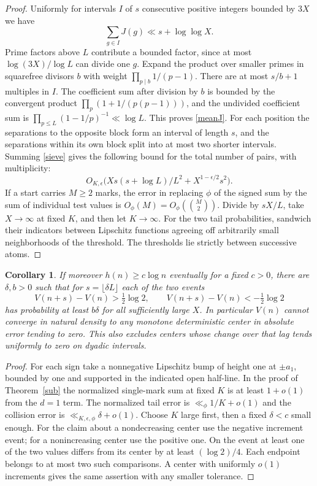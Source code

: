 \documentclass[10pt]{article}
\newtheorem{corollary}[theorem]{Corollary}
\begin{document}
\begin{proof}
Uniformly for intervals $I$ of $s$ consecutive positive integers bounded by $3X$ we have
\begin{equation}\label{meanJ}
 \sum_{g\in I}J(g)\ll s+\log\log X .
\end{equation}
Prime factors above $L$ contribute a bounded factor, since at most $\log(3X)/\log L$ can divide one $g$. Expand the product over smaller primes in squarefree divisors $b$ with weight $\prod_{p\mid b}1/(p-1)$. There are at most $s/b+1$ multiples in $I$. The coefficient sum after division by $b$ is bounded by the convergent product $\prod_p(1+1/(p(p-1)))$, and the undivided coefficient sum is $\prod_{p\le L}(1-1/p)^{-1}\ll\log L$. This proves \eqref{meanJ}. For each position the separations to the opposite block form an interval of length $s$, and the separations within its own block split into at most two shorter intervals. Summing \eqref{sieve} gives the following bound for the total number of pairs, with multiplicity:
\[
 O_{K,\epsilon}\big(Xs(s+\log L)/L^2+X^{1-\epsilon/2}s^2\big).
\]
If a start carries $M\ge2$ marks, the error in replacing $\phi$ of the signed sum by the sum of individual test values is $O_\phi(M)=O_\phi(\binom M2)$. Divide by $sX/L$, take $X\to\infty$ at fixed $K$, and then let $K\to\infty$. For the two tail probabilities, sandwich their indicators between Lipschitz functions agreeing off arbitrarily small neighborhoods of the threshold. The thresholds lie strictly between successive atoms.
\end{proof}

\begin{corollary}\label{anti}
If moreover $h(n)\ge c\log n$ eventually for a fixed $c>0$, there are $\delta,b>0$ such that for $s=\lfloor\delta L\rfloor$ each of the two events
\[
 V(n+s)-V(n)>\tfrac12\log 2,\qquad
 V(n+s)-V(n)<-\tfrac12\log 2
\]
has probability at least $b\delta$ for all sufficiently large $X$. In particular $V(n)$ cannot converge in natural density to any monotone deterministic center in absolute error tending to zero. This also excludes centers whose change over that lag tends uniformly to zero on dyadic intervals.
\end{corollary}
\begin{proof}
For each sign take a nonnegative Lipschitz bump of height one at $\pm a_1$, bounded by one and supported in the indicated open half-line. In the proof of Theorem~\ref{sub} the normalized single-mark sum at fixed $K$ is at least $1+o(1)$ from the $d=1$ term. The normalized tail error is $\ll_\phi 1/K+o(1)$ and the collision error is $\ll_{K,\epsilon,\phi}\delta+o(1)$. Choose $K$ large first, then a fixed $\delta<c$ small enough. For the claim about a nondecreasing center use the negative increment event; for a nonincreasing center use the positive one. On the event at least one of the two values differs from its center by at least $(\log2)/4$. Each endpoint belongs to at most two such comparisons. A center with uniformly $o(1)$ increments gives the same assertion with any smaller tolerance.
\end{proof}
\end{document}
